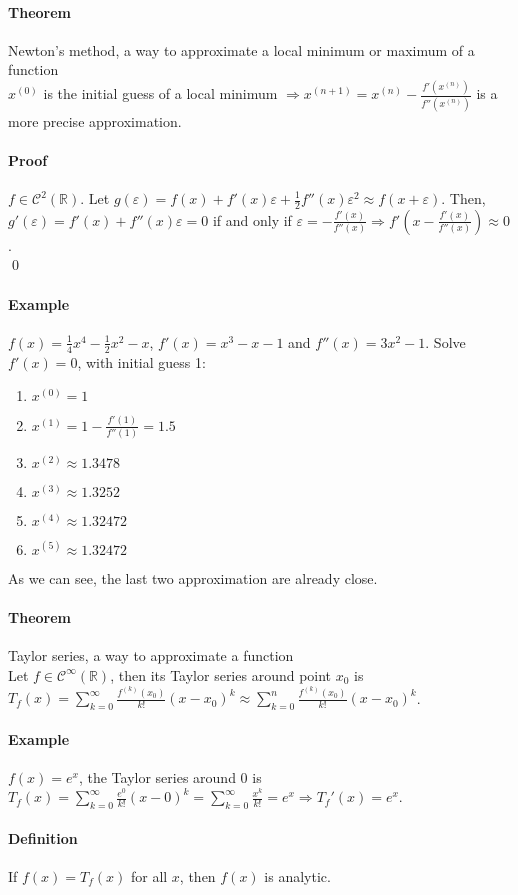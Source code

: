 \documentclass{article}
\newcommand{\DS}{\displaystyle}
\newcommand{\R}{\mathbb{R}}
\newcommand{\C}{\mathcal{C}}
\newcommand{\Ep}{\varepsilon}
\newcommand{\Def}{\paragraph{Definition}}
\newcommand{\Theorem}{\paragraph{Theorem}}
\newcommand{\Proof}{\paragraph{Proof}}
\newcommand{\Example}{\paragraph{Example}}
\begin{document}
	\Theorem Newton's method, a way to approximate a local minimum or maximum of a
	function
\\ $x^{(0)}$ is the initial guess of a local minimum $\Rightarrow x^{(n+1)} =
	x^{(n)} - \frac{f'(x^{(n)})}{f''(x^{(n)})}$ is a more precise approximation.

	\Proof $f \in \C^2(\R)$. Let $g(\Ep) = f(x) + f'(x)\Ep +
	\frac{1}{2}f''(x)\Ep^2 \approx f(x+\Ep)$. Then, $g'(\Ep) = f'(x) + f''(x)\Ep =
	0$ if and only if $\Ep = -\frac{f'(x)}{f''(x)} \Rightarrow
	f'(x - \frac{f'(x)}{f''(x)}) \approx 0$.
\\\qed

	\Example $f(x) = \frac{1}{4}x^4 - \frac{1}{2}x^2 - x$, $f'(x) = x^3 - x - 1$
	and $f''(x) = 3x^2 - 1$. Solve $f'(x) = 0$, with initial guess 1:
	\begin{enumerate}
		\item $x^{(0)} = 1$
		\item $x^{(1)} = 1 - \frac{f'(1)}{f''(1)} = 1.5$
		\item $x^{(2)} \approx 1.3478$
		\item $x^{(3)} \approx 1.3252$
		\item $x^{(4)} \approx 1.32472$
		\item $x^{(5)} \approx 1.32472$
	\end{enumerate}
	As we can see, the last two approximation are already close.

	\Theorem Taylor series, a way to approximate a function
\\Let $f \in \C^\infty(\R)$, then its Taylor series around point $x_0$ is
	$\DS T_f(x) = \sum_{k=0}^\infty \frac{f^{(k)}(x_0)}{k!}(x-x_0)^k \approx
	\sum_{k=0}^n \frac{f^{(k)}(x_0)}{k!}(x-x_0)^k$.

	\Example $f(x) = e^x$, the Taylor series around 0 is $\DS T_f(x) =
	\sum_{k=0}^\infty \frac{e^0}{k!}(x-0)^k = \sum_{k=0}^\infty \frac{x^k}{k!} =
	e^x \Rightarrow T_f'(x) = e^x$.

	\Def If $f(x) = T_f(x)$ for all $x$, then $f(x)$ is analytic.
\end{document}
